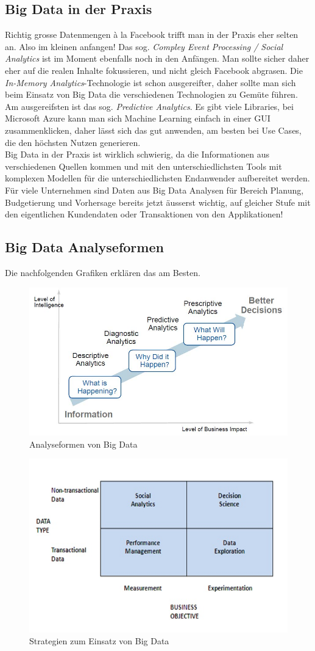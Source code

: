 \subsection{Big Data in der Praxis}
Richtig grosse Datenmengen à la Facebook trifft man in der Praxis eher selten an. Also im kleinen anfangen! Das sog. \textit{Compley Event Processing / Social Analytics} ist im Moment ebenfalls noch in den Anfängen. Man sollte sicher daher eher auf die realen Inhalte fokussieren, und nicht gleich Facebook abgrasen. Die \textit{In-Memory Analytics}-Technologie ist schon ausgereifter, daher sollte man sich beim Einsatz von Big Data die verschiedenen Technologien zu Gemüte führen. Am ausgereifsten ist das sog. \textit{Predictive Analytics}. Es gibt viele Libraries, bei Microsoft Azure kann man sich Machine Learning einfach in einer GUI zusammenklicken, daher lässt sich das gut anwenden, am besten bei Use Cases, die den höchsten Nutzen generieren. \\
Big Data in der Praxis ist wirklich schwierig, da die Informationen aus verschiedenen Quellen kommen und mit den unterschiedlichsten Tools mit komplexen Modellen für die unterschiedlichsten Endanwender aufbereitet werden.\\
Für viele Unternehmen sind Daten aus Big Data Analysen für Bereich Planung, Budgetierung und Vorhersage bereits jetzt äusserst wichtig, auf gleicher Stufe mit den eigentlichen Kundendaten oder Transaktionen von den Applikationen!
\subsection{Big Data Analyseformen}
Die nachfolgenden Grafiken erklären das am Besten.
\begin{figure}
\centering
\includegraphics[width=0.7\linewidth]{fig/analyseformen}
\caption{Analyseformen von Big Data}
\label{fig:analyseformen}
\end{figure}
\begin{figure}
\centering
\includegraphics[width=0.7\linewidth]{fig/strategy_bigdata}
\caption{Strategien zum Einsatz von Big Data}
\label{fig:strategy_bigdata}
\end{figure}
